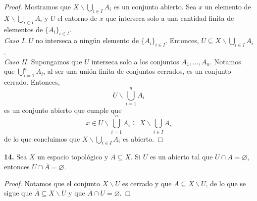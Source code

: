 \documentclass{article}
\begin{document}
\begin{proof}
	Mostramos que $X \backslash \bigcup_{i \in I} A_{i}$ es un conjunto abierto. Sea $x$ un elemento de $ X \backslash \bigcup_{i \in I} A_{i}$ y $U$ el entorno de $x$ que interseca solo a una cantidad finita de elementos de $\{A_{i} \}_{i \in I}$. \\
	
	\textit{Caso I. } $U$ no interseca a ningún elemento de $\{A_{i} \}_{i \in I}$. Entonces, $U \subseteq X \backslash \bigcup_{i \in I} A_{i}$. \\
	
	\textit{Caso II. } Supongamos que $U$ interseca solo a los conjuntos $A_{1}, \ldots, A_{n}$. Notamos que $\bigcup_{i=1}^{n} A_{i}$, al ser una unión finita de conjuntos cerrados, es un conjunto cerrado. Entonces,
	$$U \backslash \bigcup_{i = 1}^{n} A_{i} $$
	es un conjunto abierto que cumple que
	$$ x \in U \backslash \bigcup_{i = 1}^{n} A_{i} \subseteq  X \backslash \bigcup_{i \in I} A_{i}$$
	de lo que concluimos que $X \backslash \bigcup_{i \in I} A_{i}$ es abierto. 
\end{proof}

\begin{mybox}
	\textbf{14. }Sea $X$ un espacio topológico y $A \subseteq X$. Si $U$ es un abierto tal que $U \cap A = \varnothing$, entonces $U \cap \bar{A} = \varnothing$.
\end{mybox}	
\begin{proof}
	Notamos que el conjunto $X \backslash U$ es cerrado y que $A \subseteq X \backslash U$, de lo que se sigue que $\bar{A} \subseteq X \backslash U$ y que $ \bar{A} \cap U = \varnothing$. 
\end{proof}
\end{document}
